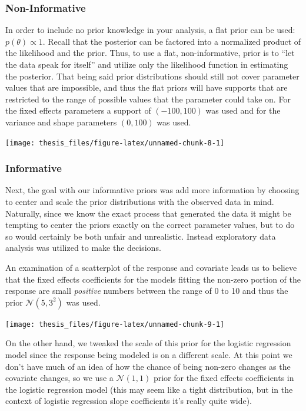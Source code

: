 \documentclass[12pt,twoside]{reedthesis}
\begin{document}
\hypertarget{non-informative}{%
\subsubsection{Non-Informative}\label{non-informative}}

In order to include no prior knowledge in your analysis, a flat prior can be used: \(p(\theta) \propto 1\). Recall that the posterior can be factored into a normalized product of the likelihood and the prior. Thus, to use a flat, non-informative, prior is to ``let the data speak for itself'' and utilize only the likelihood function in estimating the posterior. That being said prior distributions should still not cover parameter values that are impossible, and thus the flat priors will have supports that are restricted to the range of possible values that the parameter could take on. For the fixed effects parameters a support of \((-100, 100)\) was used and for the variance and shape parameters \((0, 100)\) was used.
\begin{center}\texttt{[image: thesis\_files/figure-latex/unnamed-chunk-8-1]} \end{center}

\hypertarget{info}{%
\subsubsection{Informative}\label{info}}

Next, the goal with our informative priors was add more information by choosing to center and scale the prior distributions with the observed data in mind. Naturally, since we know the exact process that generated the data it might be tempting to center the priors exactly on the correct parameter values, but to do so would certainly be both unfair and unrealistic. Instead exploratory data analysis was utilized to make the decisions.

An examination of a scatterplot of the response and covariate leads us to believe that the fixed effects coefficients for the models fitting the non-zero portion of the response are small \emph{positive} numbers between the range of 0 to 10 and thus the prior \(\mathcal{N}(5, 3^2)\) was used.
\begin{center}\texttt{[image: thesis\_files/figure-latex/unnamed-chunk-9-1]} \end{center}

On the other hand, we tweaked the scale of this prior for the logistic regression model since the response being modeled is on a different scale. At this point we don't have much of an idea of how the chance of being non-zero changes as the covariate changes, so we use a \(\mathcal{N}(1,1)\) prior for the fixed effects coefficients in the logistic regression model (this may seem like a tight distribution, but in the context of logistic regression slope coefficients it's really quite wide).
\end{document}
